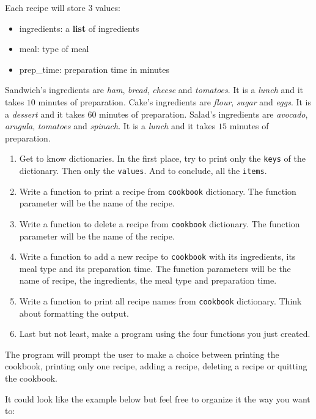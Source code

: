 \documentclass{42-en}
\begin{document}
\begin{42console}
Each recipe will store 3 values:
\begin{itemize}
	\item ingredients: a \textbf{list} of ingredients
	\item meal: type of meal
	\item prep\_time: preparation time in minutes
\end{itemize}

Sandwich's ingredients are \textit{ham}, \textit{bread}, \textit{cheese} and \textit{tomatoes}.
It is a \textit{lunch} and it takes $10$ minutes of preparation.  
Cake's ingredients are \textit{flour}, \textit{sugar} and \textit{eggs}.
It is a \textit{dessert} and it takes $60$ minutes of preparation.  
Salad's ingredients are \textit{avocado}, \textit{arugula}, \textit{tomatoes} and \textit{spinach}.
It is a \textit{lunch} and it takes $15$ minutes of preparation.

\begin{enumerate}
	\item Get to know dictionaries. In the first place, try to print only the \texttt{keys} of the dictionary. Then only the \texttt{values}. And to conclude, all the \texttt{items}.
	\item Write a function to print a recipe from \texttt{cookbook} dictionary. The function parameter will be the name of the recipe.
	\item Write a function to delete a recipe from \texttt{cookbook} dictionary. The function parameter will be the name of the recipe.
	\item Write a function to add a new recipe to \texttt{cookbook} with its ingredients, its meal type and its preparation time. The function parameters will be the name of recipe, the ingredients, the meal type and preparation time.
	\item Write a function to print all recipe names from \texttt{cookbook} dictionary. Think about formatting the output.
	\item Last but not least, make a program using the four functions you just created.
\end{enumerate}

The program will prompt the user to make a choice between printing the cookbook, printing only one recipe, adding a recipe, deleting a recipe or quitting the cookbook.


It could look like the example below but feel free to organize it the way you want to:

\end{42console}
\end{document}
